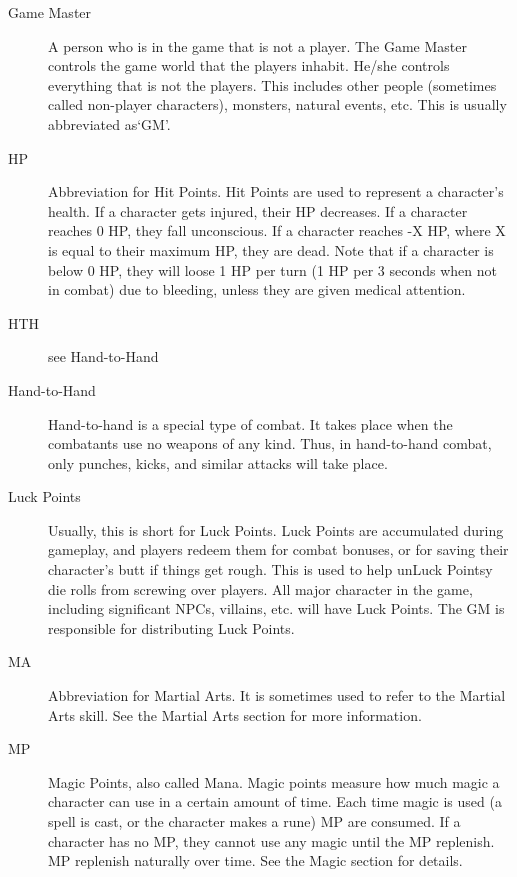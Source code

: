 \documentclass[twoside]{book}
\begin{document}
\begin{description}
  \item[Game Master] 
    {  
    A person who is in the game that is not a player. The Game Master controls the game world that the players inhabit. He/she controls everything that is not the players. This includes other people (sometimes called non-player characters), monsters, natural events, etc. This is usually abbreviated as`GM'.
    }
  
  \item[HP] 
    {  
    Abbreviation for Hit Points. Hit Points are used to represent a character's health. If a character gets injured, their HP decreases. If a character reaches 0 HP, they fall unconscious. If a character reaches -X HP, where X is equal to their maximum HP, they are dead. Note that if a character is below 0 HP, they will loose 1 HP per turn (1 HP per 3 seconds when not in combat) due to bleeding, unless they are given medical attention.
    }
  
  \item[HTH] 
    {  
    see Hand-to-Hand
    }
  
  \item[Hand-to-Hand] 
    {  
    Hand-to-hand is a special type of combat. It takes place when the combatants use no weapons of any kind. Thus, in hand-to-hand combat, only punches, kicks, and similar attacks will take place.
    }
  
  \item[Luck Points] 
    {  
    Usually, this is short for Luck Points. Luck Points are accumulated during gameplay, and players redeem them for combat bonuses, or for saving their character's butt if things get rough. This is used to help unLuck Pointsy die rolls from screwing over players. All major character in the game, including significant NPCs, villains, etc. will have Luck Points. The GM is responsible for distributing Luck Points.
    }
  
  \item[MA] 
    {  
    Abbreviation for Martial Arts. It is sometimes used to refer to the Martial Arts skill. See the Martial Arts section for more information.
    }
  
  \item[MP] 
    {  
    Magic Points, also called Mana. Magic points measure how much magic a character can use in a certain amount of time. Each time magic is used (a spell is cast, or the character makes a rune) MP are consumed. If a character has no MP, they cannot use any magic until the MP replenish. MP replenish naturally over time. See the Magic section for details.
    }
  

\end{description}
\end{document}
